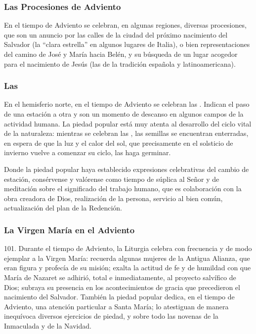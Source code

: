 \begin{introstyle}
	\subsubsection{Las Procesiones de Adviento}
	
	En el tiempo de Adviento se celebran, en algunas regiones, diversas	procesiones, que son un anuncio por las calles de la ciudad del próximo	nacimiento del Salvador (la ``clara estrella'' en algunos lugares de Italia), o bien representaciones del camino de José y María hacia Belén,
	y su búsqueda de un lugar acogedor para el nacimiento de Jesús (las	 de la tradición española y latinoamericana).
	

	\subsubsection{Las }
	
	En el hemisferio norte, en el tiempo de Adviento se celebran las . Indican el paso de una estación a otra y son	un momento de descanso en algunos campos de la actividad humana. La piedad popular está muy atenta al desarrollo del ciclo vital de la naturaleza: mientras se celebran las , las semillas se encuentran enterradas, en espera de que la luz y el calor del sol, que precisamente en el solsticio de invierno vuelve a comenzar su ciclo, las haga germinar.
	
	Donde la piedad popular haya establecido expresiones celebrativas del cambio de estación, consérvense y valórense como tiempo de súplica al Señor y de meditación sobre el significado del trabajo humano, que es colaboración con la obra creadora de Dios, realización de la persona, servicio al bien común, actualización del plan de la Redención.
	
	
	\subsubsection{La Virgen María en el Adviento}
	
	101. Durante el tiempo de Adviento, la Liturgia celebra con frecuencia y de modo ejemplar a la Virgen María: recuerda algunas mujeres de la Antigua Alianza, que eran figura y profecía de su misión; exalta la actitud de fe y de humildad con que María de Nazaret se adhirió, total e
	inmediatamente, al proyecto salvífico de Dios; subraya su presencia en los acontecimientos de gracia que precedieron el nacimiento del Salvador. También la piedad popular dedica, en el tiempo de Adviento,	una atención particular a Santa María; lo atestiguan de manera inequívoca diversos ejercicios de piedad, y sobre todo las novenas de la Inmaculada y de la Navidad.
	

\end{introstyle}

